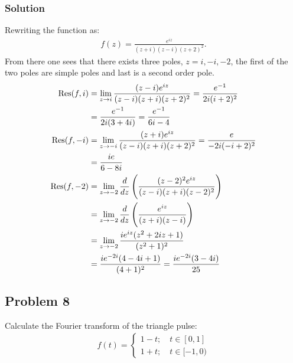 \subsubsection*{Solution}
Rewriting the function as:
\begin{align*}
    f(z) = \frac{e^{iz}}{(z+ i)(z- i)(z+2)^2}.
\end{align*}From there one sees that there exists three poles, $z = i, -i, -2$, the first of the two poles are simple poles and last is a second order pole.
\begin{align*}
    \text{Res}(f,i) &= \lim_{z\to i}\frac{(z-i)e^{iz}}{(z-i)(z+i)(z+2)^2} = \frac{e^{-1}}{2i(i + 2)^2}\\
    &=\frac{e^{-1}}{2i(3 + 4i)} = \frac{e^{-1}}{6i - 4}\\
    \text{Res}(f,-i) &= \lim_{z\to -i}\frac{(z +i)e^{iz}}{(z-i)(z+i)(z+2)^2} = \frac{e}{-2i(-i + 2)^2}\\
    &=\frac{ie}{6- 8i}\\
    \text{Res}(f,-2) &= \lim_{z\to -2}\frac{d}{dz}\left(\frac{(z-2)^2e^{iz}}{(z-i)(z+i)(z-2)^2}\right)\\
    &=\lim_{z\to -2}\frac{d}{dz}\left(\frac{e^{iz}}{(z+i)(z-i)}\right)\\
    &=\lim_{z\to-2} \frac{i e^{i z} (z^2 + 2 i z + 1)}{(z^2 + 1)^2}\\
    &=\frac{i e^{-2i} (4 -4 i  + 1)}{(4 + 1)^2} = \frac{ie^{-2i}(3-4i)}{25}
\end{align*}

\subsection*{Problem 8}
Calculate the Fourier transform of the triangle pulse:
\begin{align*}
    f(t) = \begin{cases}
        1-t; \quad t \in [0, 1]\\
        1 + t; \quad t \in [-1, 0)
    \end{cases}
\end{align*}


